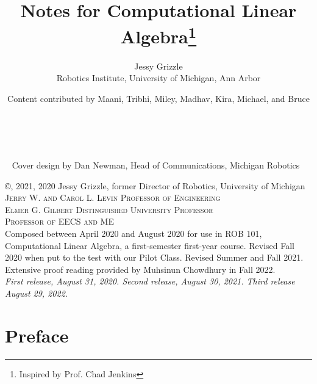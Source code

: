 \documentclass[letterpaper]{book}
\title{Notes for Computational Linear Algebra\thanks{Inspired by Prof. Chad Jenkins}}
\date{}
\author{Jessy Grizzle\\ Robotics Institute, University of Michigan, Ann Arbor
\and Content contributed by Maani, Tribhi, Miley, Madhav, Kira, Michael, and Bruce}
\makeatletter
\renewcommand{\frontmatter}{\cleardoublepage\@mainmatterfalse}
\makeatother
\begin{document}
\newtheorem{example}{Example}

\begingroup
\thispagestyle{empty}

\mbox{  }

\endgroup

\clearpage


\begingroup
\thispagestyle{empty}


~\vfill
\thispagestyle{empty}
\noindent Cover design by Dan Newman, Head of Communications, Michigan Robotics

\vspace*{2cm}
\noindent\copyright{}, 2021, 2020	Jessy Grizzle,  former Director of Robotics, University of Michigan	\\
\noindent \textsc{Jerry W. and Carol L. Levin Professor of Engineering\\
Elmer G. Gilbert Distinguished University Professor\\
Professor of EECS and ME}\\


\noindent Composed between April 2020 and August 2020 for use in ROB 101, Computational Linear Algebra, a first-semester first-year course. Revised Fall 2020 when put to the test with our Pilot Class. Revised Summer and Fall 2021. Extensive proof reading provided by 
Muhsinun Chowdhury in Fall 2022. 
\\ %

\noindent \textit{First release, August 31, 2020. Second release, August 30, 2021. Third release August 29, 2022.} %


\endgroup

\frontmatter
\tableofcontents
\chapter{Preface}

\end{document}
